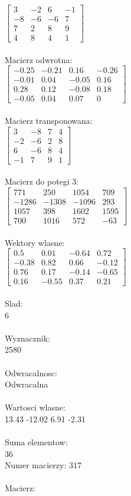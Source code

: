 \documentclass[a4paper,12pt]{article}
\begin{document}
$\begin{bmatrix} 3&-2&6&-1\\-8&-6&-6&7\\7&2&8&9\\4&8&4&1 \end{bmatrix}$
\\
\\
Macierz odwrotna:\\

$\begin{bmatrix} -0.25&-0.21&0.16&-0.26\\-0.01&0.04&-0.05&0.16\\0.28&0.12&-0.08&0.18\\-0.05&0.04&0.07&0 \end{bmatrix}$
\\
\\
Macierz transponowana:\\

$\begin{bmatrix} 3&-8&7&4\\-2&-6&2&8\\6&-6&8&4\\-1&7&9&1 \end{bmatrix}$
\\
\\
Macierz do potegi 3:\\

$\begin{bmatrix} 771&250&1054&709\\-1286&-1308&-1096&293\\1057&398&1602&1595\\700&1016&572&-63 \end{bmatrix}$
\\
\\
Wektory wlasne:\\

$\begin{bmatrix} 0.5&0.01&-0.64&0.72\\-0.38&0.82&0.66&-0.12\\0.76&0.17&-0.14&-0.65\\0.16&-0.55&0.37&0.21 \end{bmatrix}$
\\
\\
Slad:\\
6
\\
\\
Wyznacznik:\\
2580
\\
\\
Odwracalnosc:\\
Odwracalna
\\
\\
Wartosci wlasne:\\
13.43 -12.02 6.91 -2.31
\\
\\
Suma elementow:\\
36
\\
\newpage
Numer macierzy:
317
\\
\\
Macierz:\\
\end{document}
